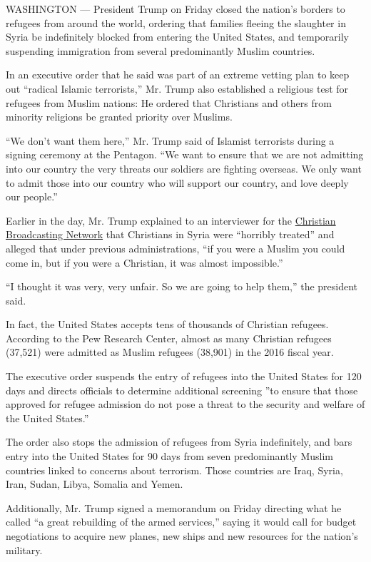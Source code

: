 WASHINGTON --- President Trump on Friday closed the nation's borders to
refugees from around the world, ordering that families fleeing the
slaughter in Syria be indefinitely blocked from entering the United
States, and temporarily suspending immigration from several
predominantly Muslim countries.

In an executive order that he said was part of an extreme vetting plan
to keep out ``radical Islamic terrorists,'' Mr. Trump also established a
religious test for refugees from Muslim nations: He ordered that
Christians and others from minority religions be granted priority over
Muslims.

``We don't want them here,'' Mr. Trump said of Islamist terrorists
during a signing ceremony at the Pentagon. ``We want to ensure that we
are not admitting into our country the very threats our soldiers are
fighting overseas. We only want to admit those into our country who will
support our country, and love deeply our people.''

Earlier in the day, Mr. Trump explained to an interviewer for the
\href{http://www1.cbn.com/home}{Christian Broadcasting Network} that
Christians in Syria were ``horribly treated'' and alleged that under
previous administrations, ``if you were a Muslim you could come in, but
if you were a Christian, it was almost impossible.''

``I thought it was very, very unfair. So we are going to help them,''
the president said.

In fact, the United States accepts tens of thousands of Christian
refugees. According to the Pew Research Center, almost as many Christian
refugees (37,521) were admitted as Muslim refugees (38,901) in the 2016
fiscal year.

The executive order suspends the entry of refugees into the United
States for 120 days and directs officials to determine additional
screening ''to ensure that those approved for refugee admission do not
pose a threat to the security and welfare of the United States.''

The order also stops the admission of refugees from Syria indefinitely,
and bars entry into the United States for 90 days from seven
predominantly Muslim countries linked to concerns about terrorism. Those
countries are Iraq, Syria, Iran, Sudan, Libya, Somalia and Yemen.

Additionally, Mr. Trump signed a memorandum on Friday directing what he
called ``a great rebuilding of the armed services,'' saying it would
call for budget negotiations to acquire new planes, new ships and new
resources for the nation's military.

